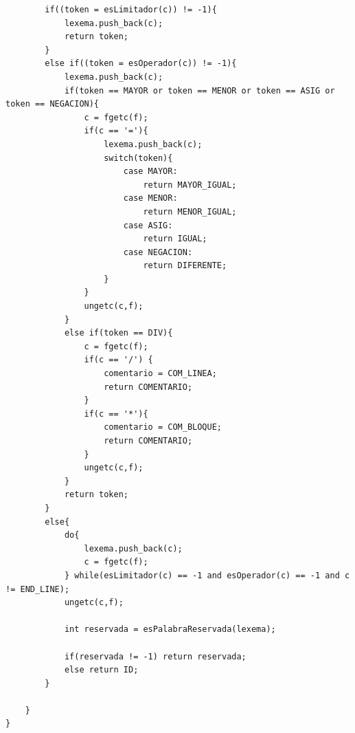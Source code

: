 \documentclass[a4paper,12pt]{article}
\begin{document}
\begin{itemize}
\begin{lstlisting}
        if((token = esLimitador(c)) != -1){
            lexema.push_back(c);
            return token;   
        } 
        else if((token = esOperador(c)) != -1){
            lexema.push_back(c);
            if(token == MAYOR or token == MENOR or token == ASIG or token == NEGACION){
                c = fgetc(f);
                if(c == '='){
                    lexema.push_back(c);
                    switch(token){
                        case MAYOR:
                            return MAYOR_IGUAL;
                        case MENOR:
                            return MENOR_IGUAL;
                        case ASIG:
                            return IGUAL;
                        case NEGACION:
                            return DIFERENTE;
                    }
                }
                ungetc(c,f);
            }
            else if(token == DIV){
                c = fgetc(f);
                if(c == '/') {
                    comentario = COM_LINEA;
                    return COMENTARIO;
                }
                if(c == '*'){
                    comentario = COM_BLOQUE;
                    return COMENTARIO;
                }
                ungetc(c,f);
            }
            return token;
        }
        else{
            do{
                lexema.push_back(c);
                c = fgetc(f);
            } while(esLimitador(c) == -1 and esOperador(c) == -1 and c != END_LINE);
            ungetc(c,f);

            int reservada = esPalabraReservada(lexema);

            if(reservada != -1) return reservada;
            else return ID;
        }
        
    }
}


\end{lstlisting}
\end{itemize}
\end{document}
